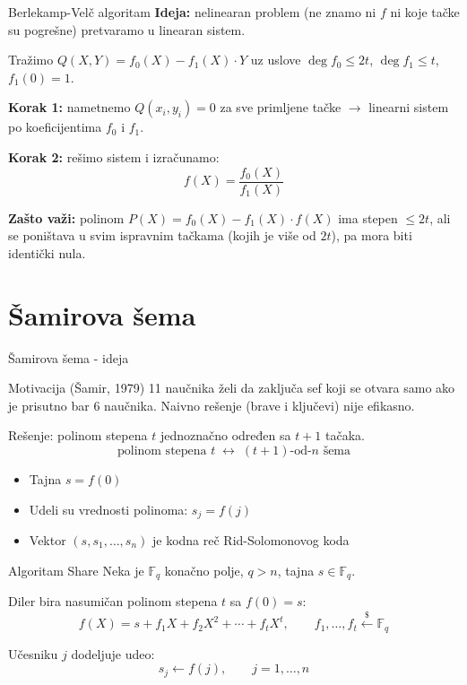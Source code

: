 \documentclass[aspectratio=1610]{beamer}
\begin{document}
\begin{frame}{Berlekamp-Velč algoritam}
\textbf{Ideja:} nelinearan problem (ne znamo ni $f$ ni koje tačke su pogrešne)
pretvaramo u linearan sistem.
 
\vspace{0.6em}
Tražimo $Q(X,Y) = f_0(X) - f_1(X) \cdot Y$ uz uslove
$\deg f_0 \leq 2t$, $\deg f_1 \leq t$, $f_1(0) = 1$.
 
\vspace{0.6em}
\textbf{Korak 1:} nametnemo $Q(x_i, y_i) = 0$ za sve primljene tačke
$\to$ linearni sistem po koeficijentima $f_0$ i $f_1$.
 
\textbf{Korak 2:} rešimo sistem i izračunamo:
\[f(X) = \frac{f_0(X)}{f_1(X)}\]
 
\textbf{Zašto važi:} polinom $P(X) = f_0(X) - f_1(X) \cdot f(X)$
ima stepen $\leq 2t$, ali se poništava u svim ispravnim tačkama
(kojih je više od $2t$), pa mora biti identički nula.
\end{frame}



\section{Šamirova šema}
 
\begin{frame}{Šamirova šema - ideja}
\begin{block}{Motivacija (Šamir, 1979)}
11 naučnika želi da zaključa sef koji se otvara samo ako je
prisutno bar 6 naučnika. Naivno rešenje (brave i ključevi) nije efikasno.
\end{block}
 
\vspace{0.8em}
Rešenje: polinom stepena $t$ jednoznačno određen sa $t+1$ tačaka.
\[\text{polinom stepena } t \;\longleftrightarrow\; (t+1)\text{-od-}n \text{ šema}\]
 
\begin{itemize}
\item Tajna $s = f(0)$
\item Udeli su vrednosti polinoma: $s_j = f(j)$
\item Vektor $(s, s_1, \ldots, s_n)$ je kodna reč Rid-Solomonovog koda
\end{itemize}
\end{frame}
 
 \begin{frame}{Algoritam Share}
Neka je $\mathbb{F}_q$ konačno polje, $q > n$, tajna $s \in \mathbb{F}_q$.
 
\vspace{0.8em}
Diler bira nasumičan polinom stepena $t$ sa $f(0) = s$:
\[f(X) = s + f_1 X + f_2 X^2 + \cdots + f_t X^t,
\qquad f_1, \ldots, f_t \overset{\$}{\leftarrow} \mathbb{F}_q\]
 
Učesniku $j$ dodeljuje udeo:
\[s_j \leftarrow f(j), \qquad j = 1, \ldots, n\]
\end{frame}
 
\end{document}
